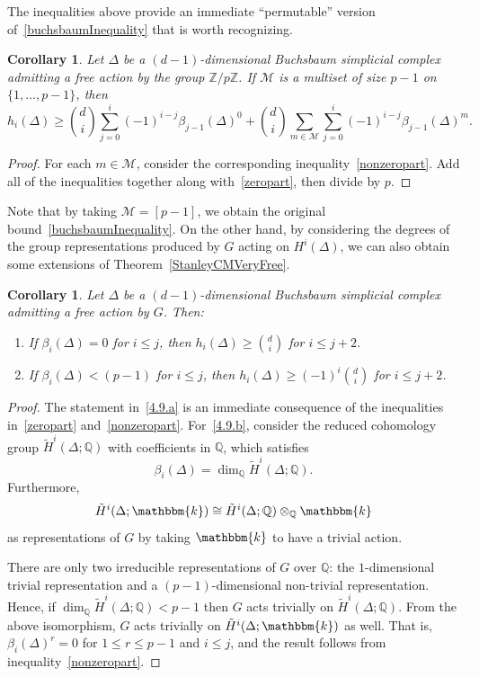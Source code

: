 \documentclass[10pt]{amsart}
\newtheorem{coro}[theo]{Corollary}
\theoremstyle{definition}
\newcommand{\field}{\mathbbm{k}}
\newcommand{\QQ}{{\mathbb Q}}
\newcommand{\ZZ}{{\mathbb Z}}
\newcommand*{\alphenumi}{\renewcommand*{\theenumi}{\alph{enumi}}}
\begin{document}
The inequalities above provide an immediate ``permutable'' version of~\eqref{buchsbaumInequality} that is worth recognizing.

\begin{coro}\label{multiset}
Let $\Delta$ be a $(d-1)$-dimensional Buchsbaum simplicial complex admitting a free action by the group $\ZZ/p\ZZ$. If $\mathcal{M}$ is a multiset of size $p-1$ on $\{1, \ldots, p-1\}$, then
\[
h_i(\Delta)\ge\binom{d}{i}\sum_{j=0}^i(-1)^{i-j}\beta_{j-1}(\Delta)^0+\binom{d}{i}\sum_{m\in\mathcal{M}}\sum_{j=0}^i(-1)^{i-j}\beta_{j-1}(\Delta)^m.
\]
\end{coro}

\begin{proof}
For each $m\in \mathcal{M}$, consider the corresponding inequality~\eqref{nonzeropart}. Add all of the inequalities together along with~\eqref{zeropart}, then divide by $p$.
\end{proof}

Note that by taking $\mathcal{M}=[p-1]$, we obtain the original bound~\eqref{buchsbaumInequality}. On the other hand, by considering the degrees of the group representations produced by $G$ acting on $H^i(\Delta)$, we can also obtain some extensions of Theorem~\ref{StanleyCMVeryFree}.

\begin{coro}
Let $\Delta$ be a $(d-1)$-dimensional Buchsbaum simplicial complex admitting a free action by $G$. Then:
\begin{enumerate}%
\item \label{4.9.a} If $\beta_i(\Delta)=0$ for $i\le j$, then $h_i(\Delta)\ge\binom{d}{i}$ for $i\le j+2$.
\item \label{4.9.b} If $\beta_i(\Delta)<(p-1)$ for $i\le j$, then $h_i(\Delta)\ge (-1)^i\binom{d}{i}$ for $i\le j+2$.
\end{enumerate}
\end{coro}

\begin{proof}
The statement in~\eqref{4.9.a} is an immediate consequence of the inequalities in~\eqref{zeropart} and~\eqref{nonzeropart}. For~\eqref{4.9.b}, consider the reduced cohomology group $\tilde{H}^i(\Delta; \QQ)$ with coefficients in $\QQ$, which satisfies
\[
\beta_i(\Delta)=\dim_\QQ \tilde{H}^i(\Delta; \QQ).
\]
Furthermore,
\[
\tilde{H}^i(\Delta; \field)\cong \tilde{H}^i(\Delta; \QQ)\otimes_\QQ \field
\]
as representations of $G$ by taking $\field$ to have a trivial action.

There are only two irreducible representations of $G$ over $\QQ$: the $1$-dimensional trivial representation and a $(p-1)$-dimensional non-trivial representation. Hence, if $\dim_\QQ \tilde{H}^i(\Delta; \QQ)<p-1$ then $G$ acts trivially on $\tilde{H}^i(\Delta; \QQ)$. From the above isomorphism, $G$ acts trivially on $\tilde{H}^i(\Delta;\field)$ as well. That is, $\beta_i(\Delta)^r =0$ for $1\le r\le p-1$ and $i\le j$, and the result follows from inequality~\eqref{nonzeropart}.
\end{proof}
\end{document}
